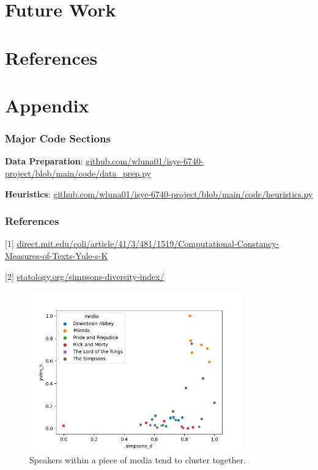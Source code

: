 \documentclass{article}
\newcommand{\largeimagewidth}{350}
\begin{document}
\begin{titlepage}
\section{Future Work}

\section{References}

\section{Appendix}
\subsubsection{Major Code Sections}
\textbf{Data Preparation}: \url{github.com/wluna01/isye-6740-project/blob/main/code/data_prep.py}

\textbf{Heuristics}: \url{github.com/wluna01/isye-6740-project/blob/main/code/heuristics.py}

\subsubsection{References}
[1] \url{direct.mit.edu/coli/article/41/3/481/1519/Computational-Constancy-Measures-of-Texts-Yule-s-K}

[2] \url{statology.org/simpsons-diversity-index/}

\begin{figure}[H]
\centering
\includegraphics[width=\largeimagewidth]{images/heuristics.png}
\caption{Speakers within a piece of media tend to cluster together.}
\end{figure}


\end{titlepage}
\end{document}
